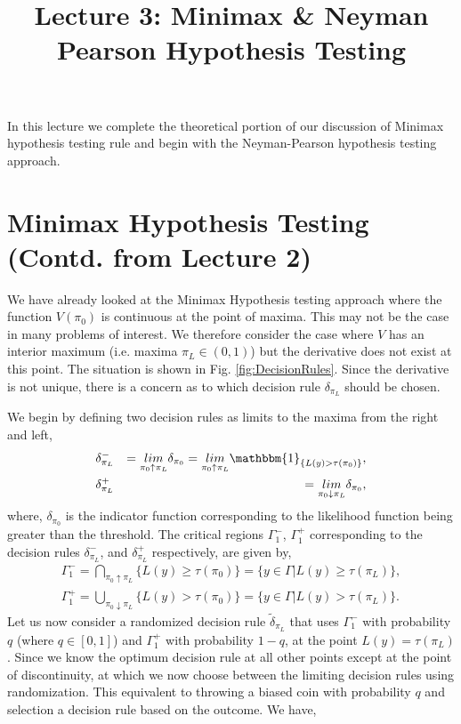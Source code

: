 \documentclass[a4paper,english,12pt]{article}
\title{Lecture 3: Minimax \& Neyman Pearson Hypothesis Testing}
\author{}
\begin{document}
\maketitle
In this lecture we complete the theoretical portion of our discussion of Minimax hypothesis testing rule and begin with the Neyman-Pearson hypothesis testing approach.
\section{Minimax Hypothesis Testing (Contd. from Lecture 2)}
We have already looked at the Minimax Hypothesis testing approach where the function $V(\pi_0)$ is continuous at the point of maxima. This may not be the case in many problems of interest. We therefore consider the case where $V$ has an interior maximum (i.e. maxima  $\pi_{L} \in (0,1)$) but the derivative does not exist at this point. The situation is shown in Fig. \ref{fig:DecisionRules}.
Since the derivative is not unique, there is a concern as to which decision rule $\delta_{\pi_{L}}$ should be chosen.
\par We begin by defining two decision rules as limits to the maxima from the right and left, 
\begin{eqnarray}
&\delta_{\pi_{L}}^{-}& = \underset{\pi_0 \uparrow \pi_L}{lim} \delta_{\pi_0} = \underset{\pi_0 \uparrow \pi_L}{lim} \mathbbm{1}_{\{L(y) > \tau (\pi_0)\}}, \nonumber \\
&\delta_{\pi_{L}}^{+}& = \underset{\pi_0 \downarrow \pi_L}{lim} \delta_{\pi_0},
\end{eqnarray}
where, $\delta_{\pi_0}$ is the indicator function corresponding to the likelihood function being greater than the threshold. The critical regions $\Gamma_{1}^{-}$, $\Gamma_{1}^{+}$ corresponding to the decision rules $\delta_{\pi_{L}}^{-}$, and $\delta_{\pi_{L}}^{+}$ respectively, are given by,
\begin{eqnarray}
\Gamma_{1}^{-} = \underset{\pi_0 \uparrow \pi_L}{\bigcap} \{ L(y) \geq \tau(\pi_0)\} = \{ y \in \Gamma | L(y) \geq \tau(\pi_L) \}, \nonumber \\
\Gamma_{1}^{+} = \underset{\pi_0 \downarrow \pi_L}{\bigcup} \{ L(y) > \tau(\pi_0)\} = \{ y \in \Gamma | L(y) > \tau (\pi_L) \}.
\end{eqnarray}
Let us now consider a randomized decision rule ${{\tilde \delta}_{\pi_L}}$ that uses $\Gamma_1^{-}$ with probability $q$ (where $q \in [0,1]$) and $\Gamma_1^{+}$ with probability $1-q$, at the point $L(y) = \tau(\pi_L)$. Since we know the optimum decision rule at all other points except at the point of discontinuity, at which we now choose between the limiting decision rules using randomization. This equivalent to throwing a biased coin with probability $q$ and selection a decision rule based on the outcome. We have,
\end{document}
